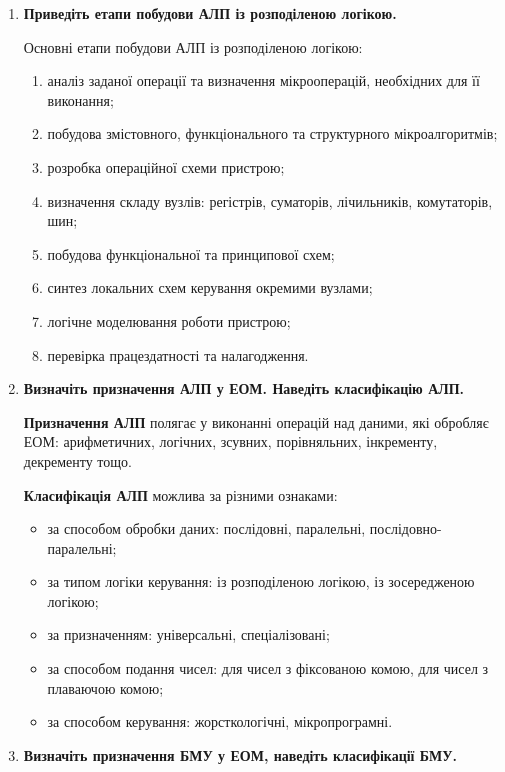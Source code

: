 \documentclass[12pt,a4paper]{article}
\begin{document}
\begin{enumerate}
        \item \textbf{Приведіть етапи побудови АЛП із розподіленою логікою.}

        Основні етапи побудови АЛП із розподіленою логікою:
        \begin{enumerate}
            \item аналіз заданої операції та визначення мікрооперацій, необхідних для її виконання;
            \item побудова змістовного, функціонального та структурного мікроалгоритмів;
            \item розробка операційної схеми пристрою;
            \item визначення складу вузлів: регістрів, суматорів, лічильників, комутаторів, шин;
            \item побудова функціональної та принципової схем;
            \item синтез локальних схем керування окремими вузлами;
            \item логічне моделювання роботи пристрою;
            \item перевірка працездатності та налагодження.
        \end{enumerate}

        \item \textbf{Визначіть призначення АЛП у ЕОМ. Наведіть класифікацію АЛП.}

        \textbf{Призначення АЛП} полягає у виконанні операцій над даними, які обробляє ЕОМ: арифметичних, логічних, зсувних, порівняльних, інкременту, декременту тощо.

        \textbf{Класифікація АЛП} можлива за різними ознаками:
        \begin{itemize}
            \item за способом обробки даних: послідовні, паралельні, послідовно-паралельні;
            \item за типом логіки керування: із розподіленою логікою, із зосередженою логікою;
            \item за призначенням: універсальні, спеціалізовані;
            \item за способом подання чисел: для чисел з фіксованою комою, для чисел з плаваючою комою;
            \item за способом керування: жорсткологічні, мікропрограмні.
        \end{itemize}

        \item \textbf{Визначіть призначення БМУ у ЕОМ, наведіть класифікації БМУ.}


\end{enumerate}
\end{document}
